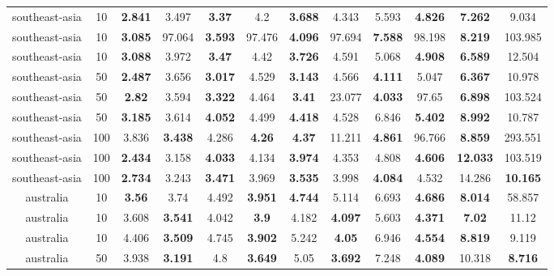 \begin{table}[h]
\begin{adjustwidth}{-2cm}{-2cm}
\begin{tabular}{|c|c|c|c|c|c|c|c|c|c|c|c|}
southeast-asia & 10 & \textbf{2.841} & 3.497 & \textbf{3.37} & 4.2 & \textbf{3.688} & 4.343 & 5.593 & \textbf{4.826} & \textbf{7.262} & 9.034 \\ \cline{3-12}
southeast-asia & 10 & \textbf{3.085} & 97.064 & \textbf{3.593} & 97.476 & \textbf{4.096} & 97.694 & \textbf{7.588} & 98.198 & \textbf{8.219} & 103.985 \\ \cline{3-12}
southeast-asia & 10 & \textbf{3.088} & 3.972 & \textbf{3.47} & 4.42 & \textbf{3.726} & 4.591 & 5.068 & \textbf{4.908} & \textbf{6.589} & 12.504 \\ \cline{3-12}
southeast-asia & 50 & \textbf{2.487} & 3.656 & \textbf{3.017} & 4.529 & \textbf{3.143} & 4.566 & \textbf{4.111} & 5.047 & \textbf{6.367} & 10.978 \\ \cline{3-12}
southeast-asia & 50 & \textbf{2.82} & 3.594 & \textbf{3.322} & 4.464 & \textbf{3.41} & 23.077 & \textbf{4.033} & 97.65 & \textbf{6.898} & 103.524 \\ \cline{3-12}
southeast-asia & 50 & \textbf{3.185} & 3.614 & \textbf{4.052} & 4.499 & \textbf{4.418} & 4.528 & 6.846 & \textbf{5.402} & \textbf{8.992} & 10.787 \\ \cline{3-12}
southeast-asia & 100 & 3.836 & \textbf{3.438} & 4.286 & \textbf{4.26} & \textbf{4.37} & 11.211 & \textbf{4.861} & 96.766 & \textbf{8.859} & 293.551 \\ \cline{3-12}
southeast-asia & 100 & \textbf{2.434} & 3.158 & \textbf{4.033} & 4.134 & \textbf{3.974} & 4.353 & 4.808 & \textbf{4.606} & \textbf{12.033} & 103.519 \\ \cline{3-12}
southeast-asia & 100 & \textbf{2.734} & 3.243 & \textbf{3.471} & 3.969 & \textbf{3.535} & 3.998 & \textbf{4.084} & 4.532 & 14.286 & \textbf{10.165} \\ \cline{3-12}
australia & 10 & \textbf{3.56} & 3.74 & 4.492 & \textbf{3.951} & \textbf{4.744} & 5.114 & 6.693 & \textbf{4.686} & \textbf{8.014} & 58.857 \\ \cline{3-12}
australia & 10 & 3.608 & \textbf{3.541} & 4.042 & \textbf{3.9} & 4.182 & \textbf{4.097} & 5.603 & \textbf{4.371} & \textbf{7.02} & 11.12 \\ \cline{3-12}
australia & 10 & 4.406 & \textbf{3.509} & 4.745 & \textbf{3.902} & 5.242 & \textbf{4.05} & 6.946 & \textbf{4.554} & \textbf{8.819} & 9.119 \\ \cline{3-12}
australia & 50 & 3.938 & \textbf{3.191} & 4.8 & \textbf{3.649} & 5.05 & \textbf{3.692} & 7.248 & \textbf{4.089} & 10.318 & \textbf{8.716} \\ \cline{3-12}

\end{tabular}
\end{adjustwidth}
\end{table}
